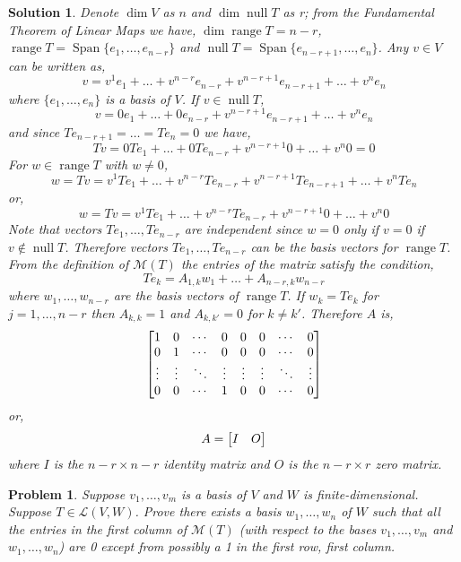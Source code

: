 \documentclass[11pt,a4paper]{scrartcl}
\DeclareMathOperator{\range}{range}
\DeclareMathOperator{\nspace}{null}
\DeclareMathOperator{\Span}{Span}
\newcommand{\lmap}[2]{\mathcal{L}(#1,#2)}
\theoremstyle{solve}
\newtheorem{problem}{Problem}
\newtheorem*{solution}{Solution}
\begin{document}
\begin{solution}Denote $\dim V$ as $n$ and                  $\dim\nspace T$ as r;
    from the Fundamental
    Theorem of Linear Maps we have,
    $\dim \range T = n-r$, 
     $\range T=\Span\{e_{1},\ldots,e_{n-r} \}$ and 
     $\nspace T = \Span\{e_{n-r+1},\ldots,e_n\}$. 
    Any $v \in V$ can be written as,
    \[
    v=v^1 e_1 + \ldots + v^{n-r} e_{n-r} + v^{n-r+1} e_{n-r+1} + \ldots + v^n e_n
    \]
    where $\{e_1,\ldots,e_n\}$ is a basis of $V$. If 
    $v \in \nspace T$,
    \[
    v =0 e_1 + \ldots + 0 e_{n-r}+ v^{n-r+1} e_{n-r+1} + \ldots + v^n e_n 
    \]
    and since $Te_{n-r+1}=\ldots=Te_n=0$ we have,
    \[
     Tv = 0 Te_1 + \ldots + 0 Te_{n-r} + v^{n-r+1} 0 + \ldots + v^{n} 0 = 0
    \]
    For $w \in \range T$ with $w\neq 0$,
    \[
    w = Tv = v^1 Te_1 + \ldots + v^{n-r} Te_{n-r} + v^{n-r+1} Te_{n-r+1} +
    \ldots + v^n Te_n
    \]
    or,
    \[
    w = Tv = v^1 Te_1 + \ldots + v^{n-r} Te_{n-r} + v^{n-r+1} 0 +
    \ldots + v^n 0
    \]
    Note that vectors $Te_1,\ldots,Te_{n-r}$ are independent since
    $w=0$ only if $v=0$ if $v \notin \nspace T$. 
    Therefore vectors $Te_1,\ldots,Te_{n-r}$ can be
    the basis vectors for $\range T$. From the definition of $\mathcal{M}(T)$ the entries
    of the matrix satisfy the condition,
    \[
    Te_k = A_{1,k}w_1 + \ldots + A_{n-r,k}w_{n-r}
    \]
    where $w_1,\ldots,w_{n-r}$ are the basis
    vectors of $\range T$. If $w_k=Te_k$
    for $j=1,\ldots,n-r$ then $A_{k,k}=1$
    and $A_{k,k'}=0$ for $k\neq k'$.
    Therefore $A$ is,
     \[
    \mqty[
    1 & 0 & \cdots & 0 & 0 & 0 & \cdots & 0  \\
    0 & 1 & \cdots & 0 & 0 & 0 &\cdots & 0 \\
    \vdots & \vdots & \ddots & \vdots & \vdots & \vdots & \ddots & \vdots \\
    0 & 0 & \cdots & 1 & 0 & 0 &  \cdots & 0
    ]
    \]   
    or,
    \[
    A = \mqty[I & O] 
    \]
    where $I$ is the $n-r \times n-r$ identity matrix
    and $O$ is the $n-r \times r$ zero matrix.
\end{solution}
\begin{problem}
    Suppose $v_1,\ldots,v_m$ is a basis of $V$ and $W$ is finite-dimensional.
    Suppose $T \in \lmap{V}{W}$. Prove there exists a basis $w_1,\ldots,w_n$
    of $W$ such that all the entries in the first column of $\mathcal{M}(T)$
    (with respect to the bases $v_1,\ldots,v_m$ and $w_1,\ldots,w_n$) are 0
    except from possibly a 1 in the first row, first column.
\end{problem}
\end{document}
